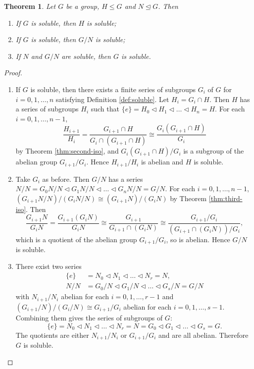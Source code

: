 \documentclass[12pt]{article}
\newtheorem{theorem}{Theorem}
\begin{document}
\begin{theorem} \label{thm:soluble-main}
    Let $G$ be a group, $H \le G$ and $N \trianglelefteq G$. Then 
    \begin{enumerate}
        \item If $G$ is soluble, then $H$ is soluble;
        \item If $G$ is soluble, then $G / N$ is soluble; 
        \item If $N$ and $G / N$ are soluble, then $G$ is soluble. 
    \end{enumerate}
\end{theorem}
\begin{proof}
\begin{enumerate}
    \item If $G$ is soluble, then there exists a finite series of subgroups $G_i$ of $G$ for $i = 0, 1, \dots, n$ satisfying Definition \ref{def:soluble}. Let $H_i = G_i \cap H$. Then $H$ has a series of subgroups $H_i$ such that $\{ e \} = H_0 \triangleleft H_1 \triangleleft \dots \triangleleft H_n = H.$
    For each $i = 0, 1, \dots, n - 1$, 
    $$
    \frac{H_{i+1}}{H_i} 
        = \frac{G_{i+1} \cap H}{G_i \cap (G_{i+1} \cap H)}
        \cong \frac{G_i(G_{i+1} \cap H)} {G_i}
    $$
    by Theorem \ref{thm:second-iso}, and ${G_i(G_{i+1} \cap H)}/{G_i}$ is a subgroup of the abelian group $G_{i+1} / G_{i}$. Hence $H_{i+1} / H_{i}$ is abelian and $H$ is soluble.
    \item Take $G_i$ as before. Then $G / N$ has a series
        $N/N = G_0 N / N \triangleleft G_1 N / N \triangleleft \dots \triangleleft G_n N / N  =  G / N. $
        For each $i = 0, 1, \dots, n - 1$, 
        $(G_{i+1} N / N) / (G_{i} N / N) \cong (G_{i+1} N) / (G_i N)$
    by Theorem \ref{thm:third-iso}. Then 
    $$
    \frac{G_{i+1} N}{G_i N} =\frac{G_{i+1}\left(G_i N\right)}{G_i N} \cong \frac{G_{i+1}}{G_{i+1} \cap\left(G_i N\right)} \cong \frac{G_{i+1} / G_i}{\left(G_{i+1} \cap\left(G_i N\right)\right) / G_i},
    $$
    which is a quotient of the abelian group $G_{i+1} / G_i$, so is abelian. Hence $G / N$ is soluble.
    \item There exist two series
$$
\begin{aligned}
\{ e \} & =N_0 \triangleleft N_1 \triangleleft \ldots \triangleleft N_r=N, \\
N / N & =G_0 / N \triangleleft G_1 / N \triangleleft \ldots \triangleleft G_s / N=G / N
\end{aligned}
$$
with $N_{i+1} / N_{i}$ abelian for each $i = 0, 1, \dots, r-1$ and $(G_{i+1} / N)  / (G_{i} / N) \cong G_{i+1} / G_i $ abelian for each $i = 0,1, \dots, s-1$. Combining them gives the series of subgroups of $G$:
$$
\{ e \}=N_0 \triangleleft N_1 \triangleleft \ldots \triangleleft N_r=N=G_0 \triangleleft G_1 \triangleleft \ldots \triangleleft G_s=G .
$$
The quotients are either $N_{i+1} / N_i$  or $G_{i+1} / G_i$ and are all abelian. Therefore $G$ is soluble.
\end{enumerate}
\end{proof}
\end{document}
